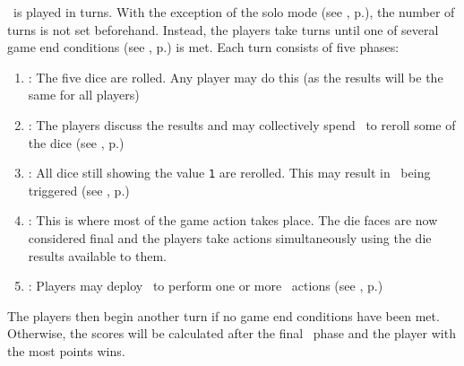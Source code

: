 \asciiplanets\ is played in turns.  With the exception of the solo mode (see , p.\pageref{sec:playercount}), the number of turns is not set beforehand.  Instead, the players take turns until one of several game end conditions (see , p.\pageref{sec:endgame}) is met.
\newline\newline
Each turn consists of five phases:
\begin{enumerate}
	\item \textbf{\dice}: The five dice are rolled.  Any player may do this (as the results will be the same for all players)
	\item \textbf{\diplomacy}: The players discuss the results and may collectively spend \currency\ to reroll some of the dice (see , p.\pageref{sec:diplomacy})
	\item \textbf{\disasters}: All dice still showing the value \texttt{1} are rerolled.  This may result in \disasters\ being triggered (see , p.\pageref{sec:disasters})
  \item \textbf{\development}: This is where most of the game action takes place. The die faces are now considered final and the players take actions simultaneously using the die results available to them.
  \item \textbf{\deployment}: Players may deploy \squadrons\ to perform one or more \military\ actions (see , p.\pageref{sec:military})
\end{enumerate}
The players then begin another turn if no game end conditions have been met.  Otherwise, the scores will be calculated after the final \deployment\ phase and the player with the most points wins.
